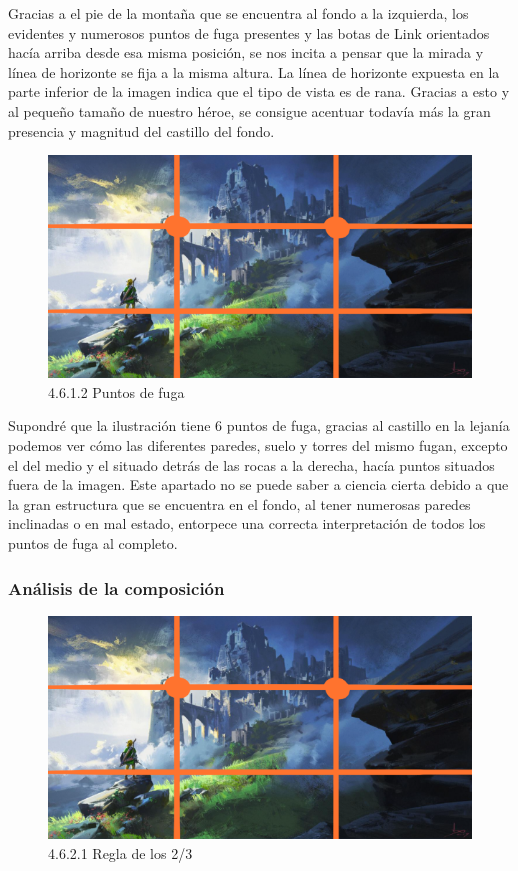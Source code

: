 \documentclass[12pt]{article}
\begin{document}
    Gracias a el pie de la montaña que se encuentra al fondo a la izquierda, los evidentes y numerosos puntos de fuga presentes y las botas de Link orientados hacía arriba desde esa misma posición, se nos incita a pensar que la mirada y línea de horizonte se fija a la misma altura. La línea de horizonte expuesta en la parte inferior de la imagen indica que el tipo de vista es de rana. 
    Gracias a esto y al pequeño tamaño de nuestro héroe, se consigue acentuar todavía más la gran presencia y magnitud del castillo del fondo.

    \begin{figure}[H]
      \centering
      \includegraphics[width=\textwidth]{images/Nerea/Nerea Zelda concept 621.PNG}
      \caption{\small 4.6.1.2 Puntos de fuga}
    \end{figure}

    Supondré que la ilustración tiene 6 puntos de fuga, gracias al castillo en la lejanía podemos ver cómo las diferentes paredes, suelo y torres del mismo fugan, excepto el del medio y el situado detrás de las rocas a la derecha, hacía puntos situados fuera de la imagen. Este apartado no se puede saber a ciencia cierta debido a que la gran estructura que se encuentra en el fondo, al tener numerosas paredes inclinadas o en mal estado, entorpece una correcta interpretación de todos los puntos de fuga al completo.

        \subsubsection{Análisis de la composición}

        
    \begin{figure}[H]
      \centering
      \includegraphics[width=\textwidth]{images/Nerea/Nerea Zelda concept 621.PNG}
      \caption{\small 4.6.2.1 Regla de los 2/3}
    \end{figure}
\end{document}
